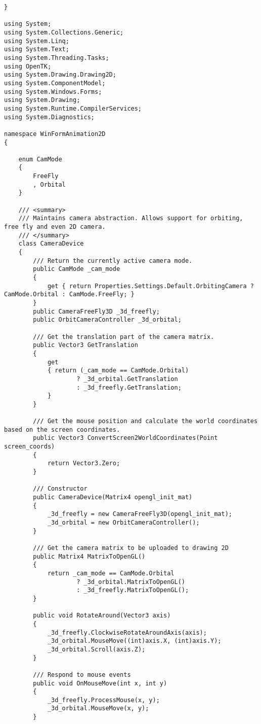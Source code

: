 \begin{scriptsize}
\begin{verbatim}
}

using System;
using System.Collections.Generic;
using System.Linq;
using System.Text;
using System.Threading.Tasks;
using OpenTK;
using System.Drawing.Drawing2D;
using System.ComponentModel;
using System.Windows.Forms;
using System.Drawing;
using System.Runtime.CompilerServices;
using System.Diagnostics;

namespace WinFormAnimation2D
{

    enum CamMode
    {
        FreeFly
        , Orbital
    }

    /// <summary>
    /// Maintains camera abstraction. Allows support for orbiting, free fly and even 2D camera.
    /// </summary>
    class CameraDevice
    {
        /// Return the currently active camera mode.
        public CamMode _cam_mode
        {
            get { return Properties.Settings.Default.OrbitingCamera ? CamMode.Orbital : CamMode.FreeFly; }
        }
        public CameraFreeFly3D _3d_freefly;
        public OrbitCameraController _3d_orbital;

        /// Get the translation part of the camera matrix.
        public Vector3 GetTranslation
        {
            get
            { return (_cam_mode == CamMode.Orbital) 
                    ? _3d_orbital.GetTranslation 
                    : _3d_freefly.GetTranslation;
            }
        }

        /// Get the mouse position and calculate the world coordinates based on the screen coordinates.
        public Vector3 ConvertScreen2WorldCoordinates(Point screen_coords)
        {
            return Vector3.Zero;
        }

        /// Constructor
        public CameraDevice(Matrix4 opengl_init_mat)
        {
            _3d_freefly = new CameraFreeFly3D(opengl_init_mat);
            _3d_orbital = new OrbitCameraController();
        }

        /// Get the camera matrix to be uploaded to drawing 2D
        public Matrix4 MatrixToOpenGL()
        {
            return _cam_mode == CamMode.Orbital 
                    ? _3d_orbital.MatrixToOpenGL() 
                    : _3d_freefly.MatrixToOpenGL();
        }

        public void RotateAround(Vector3 axis)
        {
            _3d_freefly.ClockwiseRotateAroundAxis(axis);
            _3d_orbital.MouseMove((int)axis.X, (int)axis.Y);
            _3d_orbital.Scroll(axis.Z);
        }

        /// Respond to mouse events
        public void OnMouseMove(int x, int y)
        {
            _3d_freefly.ProcessMouse(x, y);
            _3d_orbital.MouseMove(x, y);
        }


\end{verbatim}
\end{scriptsize}
